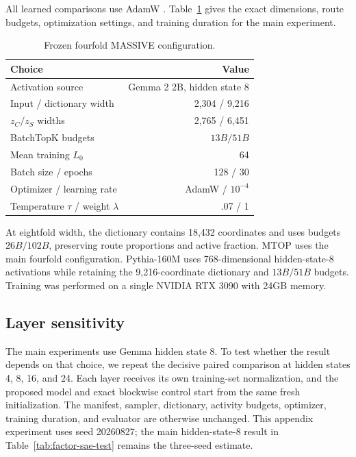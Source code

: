 All learned comparisons use AdamW \citep{loshchilov2019adamw}. Table~\ref{tab:appendix-training} gives the exact dimensions, route budgets, optimization settings, and training duration for the main experiment.

\begin{table}[h]
\centering
\caption{Frozen fourfold MASSIVE configuration.}
\label{tab:appendix-training}
\begin{tabular}{lr}
\toprule
Choice & Value \\
\midrule
Activation source & Gemma 2 2B, hidden state 8 \\
Input / dictionary width & 2,304 / 9,216 \\
$z_C / z_S$ widths & 2,765 / 6,451 \\
BatchTopK budgets & $13B / 51B$ \\
Mean training $L_0$ & 64 \\
Batch size / epochs & 128 / 30 \\
Optimizer / learning rate & AdamW / $10^{-4}$ \\
Temperature $\tau$ / weight $\lambda$ & .07 / 1 \\
\bottomrule
\end{tabular}
\end{table}

At eightfold width, the dictionary contains 18,432 coordinates and uses budgets $26B/102B$, preserving route proportions and active fraction. MTOP uses the main fourfold configuration. Pythia-160M uses 768-dimensional hidden-state-8 activations while retaining the 9,216-coordinate dictionary and $13B/51B$ budgets. Training was performed on a single NVIDIA RTX 3090 with 24GB memory.

\subsection{Layer sensitivity}

The main experiments use Gemma hidden state 8. To test whether the result depends on that choice, we repeat the decisive paired comparison at hidden states 4, 8, 16, and 24. Each layer receives its own training-set normalization, and the proposed model and exact blockwise control start from the same fresh initialization. The manifest, sampler, dictionary, activity budgets, optimizer, training duration, and evaluator are otherwise unchanged. This appendix experiment uses seed 20260827; the main hidden-state-8 result in Table~\ref{tab:factor-sae-test} remains the three-seed estimate.

